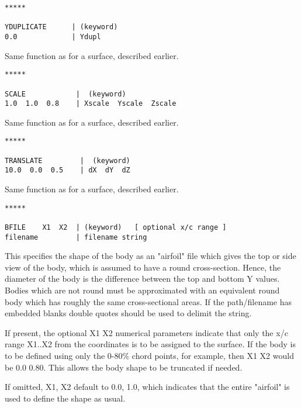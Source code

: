 \begin{lstlisting}
*****

YDUPLICATE      | (keyword)
0.0             | Ydupl

\end{lstlisting}

Same function as for a surface, described earlier.\\

\begin{lstlisting}
*****

SCALE            |  (keyword)
1.0  1.0  0.8    | Xscale  Yscale  Zscale

\end{lstlisting}

Same function as for a surface, described earlier.\\

\begin{lstlisting}
*****

TRANSLATE         |  (keyword)
10.0  0.0  0.5    | dX  dY  dZ

\end{lstlisting}

Same function as for a surface, described earlier.\\

\begin{lstlisting}
*****

BFILE    X1  X2  | (keyword)   [ optional x/c range ]
filename         | filename string

\end{lstlisting}

This specifies the shape of the body as an "airfoil" file
which gives the top or side view of the body, which is
assumed to have a round cross-section.  Hence, the diameter
of the body is the difference between the top and bottom 
Y values.  Bodies which are not round must be approximated
with an equivalent round body which has roughly the same
cross-sectional areas. If the path/filename has embedded blanks
double quotes should be used to delimit the string.

If present, the optional X1 X2 numerical parameters indicate that only 
the x/c range X1..X2 from the coordinates is to be assigned to the surface.
If the body is to be defined using only the 0-80\% chord points, for example, 
then X1 X2 would be 0.0 0.80.  This allows the body shape to be truncated if
needed.  

If omitted,  X1, X2  default to  0.0, 1.0, which indicates that the
entire "airfoil" is used to define the shape as usual.


